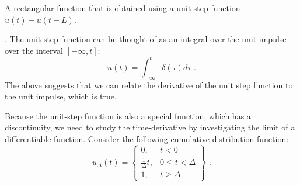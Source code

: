 \begin{marginfigure}[-0cm]
  \begin{center}
  \end{center}
  \caption{A rectangular function that is obtained using a unit step function $u(t)-u(t-L)$.}
  \label{fig:rect_fun}
\end{marginfigure}
\fi
{}
  . 
   The unit step function can be thought of as an integral over the unit impulse over the interval $[-\infty,t]$:
  \begin{equation}
    u(t) = \int_{-\infty}^{t} \delta(\tau) d\tau \,\,.
  \end{equation}
  The above suggests that we can relate the derivative of the unit step
  function to the unit impulse, which is true.

  Because the unit-step function is also a special function, which has a
  discontinuity, we need to study the time-derivative by investigating
  the limit of a differentiable function.  Consider the following
  cumulative distribution function:
  \begin{equation}
    u_{\Delta}(t) = \left\{\begin{array}{cl}
      0,                 & t < 0            \\
      \frac{1}{\Delta}t, & 0 \le t < \Delta \\
      1,                 & t \ge \Delta.
    \end{array}
    \right\} \,\,.
  \end{equation}

